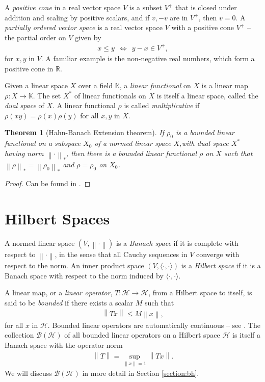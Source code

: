 \documentclass[11pt,a4paper]{report}
\theoremstyle{plain}
\newtheorem*{thm*}{Theorem}
\theoremstyle{definition}
\newcommand{\1}{\mathbbm{1}}
\newcommand{\R}{\mathbb{R}}
\renewcommand{\H}{\mathcal{H}}
\newcommand{\B}{\mathcal{B}}
\newcommand{\BH}{\mathcal{\B(\H)}}
\begin{document}
A \emph{positive cone} in a real vector space $V$ is a subset $V^+$ that is 
closed under addition and scaling by positive scalars, and if $v,-v$ are in 
$V^+$, then $v=0$. A \emph{partially ordered vector space} is a real vector 
space $V$ with a positive cone $V^+$ -- the partial order on $V$ given by
\begin{align*}
	x\leq y ~~\iff~~ y-x \in V^+,
\end{align*}
for $x,y$ in $V$.
A familiar example is the non-negative real numbers, which form a positive cone in $\R$.


Given a linear space $X$ over a field $\mathbb K$, a \emph{linear functional} on 
$X$ is a linear map $\rho:X\to\mathbb K$. The set $X^\ast$ of linear functionals 
on $X$ is itself a linear space, called the \emph{dual space} of $X$. A linear 
functional $\rho$ is called \emph{multiplicative} if $\rho(xy) = \rho(x)\rho(y)$ 
for all $x,y$ in $X$. 


\begin{thm*}[Hahn-Banach Extension theorem] 
	If $\rho_0$ is a bounded linear functional on a subspace $X_0$ of a normed 
	linear space $X$,with dual space $X^\ast$ having norm $\left\|\cdot\right\|_\ast$, then 
	there is a bounded linear functional $\rho$ on $X$ such that 
 	$\left\|\rho\right\|_\ast=\left\|\rho_0\right\|_\ast$ and $\rho=\rho_0$ on $X_0$.
\end{thm*}
\begin{proof}
	Can be found in \cite[Theorem 1.6.1, p.~44]{kadison83}.
\end{proof}

\section{Hilbert Spaces}\label{section:hscons}
A normed linear space $(V,\left\|\cdot\right\|)$ is a \emph{Banach space} if it 
is complete with respect to $\left\|\cdot\right\|$, in the sense that all Cauchy 
sequences in $V$ converge with respect to the norm. An inner product space 
$(V,\langle\cdot,\cdot\rangle)$ is a \emph{Hilbert space} if it is a Banach 
space with respect to the norm induced by $\langle\cdot,\cdot\rangle$.

A linear map, or a \emph{linear operator}, $T:\H\to\H$, from a Hilbert space to 
itself, is said to be \emph{bounded} if there exists a scalar $M$ such that 
\begin{align*}
	\left\|Tx\right\| \leq M \left\|x\right\|,
\end{align*}
for all $x$ in $\H$. Bounded linear operators are automatically continuous -- 
see \cite[1.32]{rudin91}. The collection $\BH$ of all bounded linear operators 
on a Hilbert space $\H$ is itself a Banach space with the operator norm 
\begin{align*}
	 \left\| T \right\| = \sup_{\|x\|=1} \left \|  Tx \right\|.
\end{align*}
We will discuss $\BH$ in more detail in Section \ref{section:bh}. 
\end{document}
